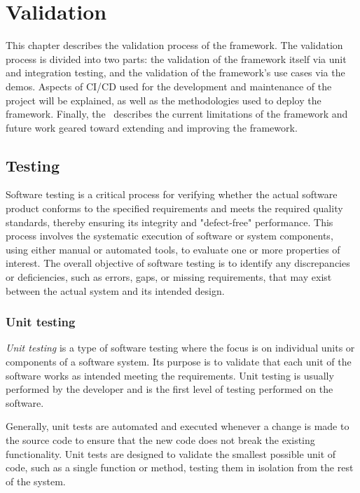 \chapter{Validation} %
\label{chap:validation}

This chapter describes the validation process of the framework. The validation process is divided into two parts: the validation of the framework
itself via unit and integration testing, and the validation of the framework's use cases via the demos.
Aspects of CI/CD used for the development and maintenance of the project will be explained, as well as the methodologies used to deploy the framework.
Finally, the~ describes the current limitations of the framework and future work geared toward extending and
improving the framework.

\section{Testing}
\label{sec:testing}

Software testing is a critical process for verifying whether the actual software product conforms to the specified requirements and meets the
required quality standards, thereby ensuring its integrity and "defect-free" performance. This process involves the systematic execution of software
or system components, using either manual or automated tools, to evaluate one or more properties of interest. The overall objective of
software testing is to identify any discrepancies or deficiencies, such as errors, gaps, or missing requirements, that may exist between the actual
system and its intended design.

\subsection{Unit testing}
\label{sec:unit-testing}

\emph{Unit testing} is a type of software testing where the focus is on individual units or components of a software system.
Its purpose is to validate that each unit of the software works as intended meeting the requirements. Unit testing is usually performed by the
developer and is the first level of testing performed on the software.

Generally, unit tests are automated and executed whenever a change is made to the source code to ensure that the new code does not break the existing
functionality. Unit tests are designed to validate the smallest possible unit of code, such as a single function or method, testing them in
isolation from the rest of the system.

